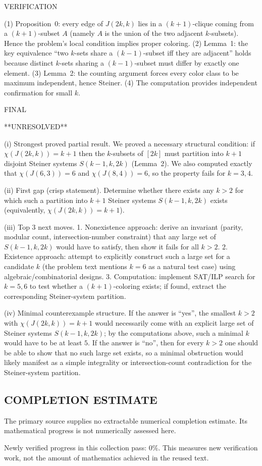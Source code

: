 VERIFICATION

(1) Proposition~0: every edge of $J(2k,k)$ lies in a $(k+1)$-clique coming from a $(k+1)$-subset $A$ (namely $A$ is the union of the two adjacent $k$-subsets). Hence the problem's local condition implies proper coloring.
(2) Lemma~1: the key equivalence “two $k$-sets share a $(k-1)$-subset iff they are adjacent” holds because distinct $k$-sets sharing a $(k-1)$-subset must differ by exactly one element.
(3) Lemma~2: the counting argument forces every color class to be maximum independent, hence Steiner.
(4) The computation provides independent confirmation for small $k$.

FINAL

**UNRESOLVED**

(i) Strongest proved partial result.
We proved a necessary structural condition: if $\chi(J(2k,k))=k+1$ then the $k$-subsets of $[2k]$ must partition into $k+1$ disjoint Steiner systems $S(k-1,k,2k)$ (Lemma~2).
We also computed exactly that $\chi(J(6,3))=6$ and $\chi(J(8,4))=6$, so the property fails for $k=3,4$.

(ii) First gap (crisp statement).
Determine whether there exists any $k>2$ for which such a partition into $k+1$ Steiner systems $S(k-1,k,2k)$ exists (equivalently, $\chi(J(2k,k))=k+1$).

(iii) Top 3 next moves.
1. Nonexistence approach: derive an invariant (parity, modular count, intersection-number constraint) that any large set of $S(k-1,k,2k)$ would have to satisfy, then show it fails for all $k>2$.
2. Existence approach: attempt to explicitly construct such a large set for a candidate $k$ (the problem text mentions $k=6$ as a natural test case) using algebraic/combinatorial designs.
3. Computation: implement SAT/ILP search for $k=5,6$ to test whether a $(k+1)$-coloring exists; if found, extract the corresponding Steiner-system partition.

(iv) Minimal counterexample structure.
If the answer is “yes”, the smallest $k>2$ with $\chi(J(2k,k))=k+1$ would necessarily come with an explicit large set of Steiner systems $S(k-1,k,2k)$; by the computations above, such a minimal $k$ would have to be at least $5$.
If the answer is “no”, then for every $k>2$ one should be able to show that no such large set exists, so a minimal obstruction would likely manifest as a simple integrality or intersection-count contradiction for the Steiner-system partition.



\subsection*{COMPLETION ESTIMATE}
The primary source supplies no extractable numerical completion estimate. Its mathematical progress is not numerically assessed here.

Newly verified progress in this collection pass: $0\%$. This measures new verification work, not the amount of mathematics achieved in the reused text.
